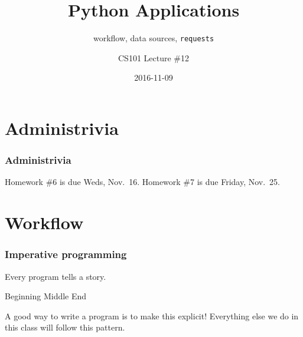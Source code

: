 \documentclass[11pt]{beamer}
\title{Python Applications}
\subtitle{workflow, data sources, \texttt{requests}}
\author{CS101 Lecture \#12}
\date{2016-11-09}
\begin{document}
  \setcounter{showProgressBar}{0}
  \setcounter{showSlideNumbers}{0}

\frame{\titlepage}

\setcounter{framenumber}{0}
\setcounter{showProgressBar}{1}
\setcounter{showSlideNumbers}{1}

\section{Administrivia}

\begin{frame}
  \frametitle{Administrivia}
  \Enlarge

  \begin{itemize}
  \myitem  Homework \#6 is due Weds, Nov.\ 16.
  \myitem  Homework \#7 is due Friday, Nov.\ 25.
  \end{itemize}
\end{frame}


\section{Workflow}

\begin{frame}[fragile]
  \frametitle{Imperative programming}
  \Enlarge

  \begin{itemize}
  \myitem  Every program tells a story. %
    \begin{itemize}
    \mysubitem  Beginning %
    \mysubitem  Middle %
    \mysubitem  End %
    \end{itemize}
  \myitem  A good way to write a program is to make this explicit! %
  \myitem  Everything else we do in this class will follow this pattern.
  \end{itemize}
\end{frame}
\end{document}
